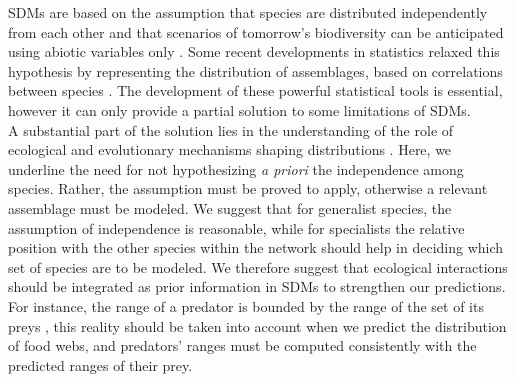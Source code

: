 SDMs are based on the assumption that species are distributed
independently from each other and that scenarios of tomorrow's
biodiversity can be anticipated using abiotic variables only
\citep{Jeschke2008}. Some recent developments in statistics relaxed this
hypothesis by representing the distribution of assemblages, based on
correlations between species \citep{Pollock2014, Warton2015b}. The
development of these powerful statistical tools is essential, however it
can only provide a partial solution to some limitations of SDMs.\\
A substantial part of the solution lies in the understanding of the role
of ecological and evolutionary mechanisms shaping distributions
\citep{Thuiller2013}. Here, we underline the need for not hypothesizing
\emph{a priori} the independence among species. Rather, the assumption
must be proved to apply, otherwise a relevant assemblage must be
modeled. We suggest that for generalist species, the assumption of
independence is reasonable, while for specialists the relative position
with the other species within the network should help in deciding which
set of species are to be modeled. We therefore suggest that ecological
interactions should be integrated as prior information in SDMs to
strengthen our predictions. For instance, the range of a predator is
bounded by the range of the set of its preys
\citep{Holt2009, Shenbrot2007}, this reality should be taken into
account when we predict the distribution of food webs, and predators'
ranges must be computed consistently with the predicted ranges of their
prey.

